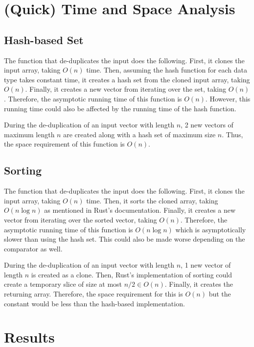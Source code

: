 \section{(Quick) Time and Space Analysis}

\subsection*{Hash-based Set}

The function that de-duplicates the input does the following. First, it clones the input array, taking $O(n)$ time.
Then, assuming the hash function for each data type takes constant time, it creates a hash set from the cloned input array, taking $O(n)$.
Finally, it creates a new vector from iterating over the set, taking $O(n)$. Therefore, the asymptotic running time of this function is $O(n)$. However, this running time could also be affected by the running time of the hash function.

During the de-duplication of an input vector with length $n$, 2 new vectors of maximum length $n$ are created along with a hash set of maximum size $n$. Thus, the space requirement of this function is $O(n)$.

\subsection*{Sorting}

The function that de-duplicates the input does the following. First, it clones the input array, taking $O(n)$ time.
Then, it sorts the cloned array, taking $O(n \log n)$ as mentioned in Rust's documentation.
Finally, it creates a new vector from iterating over the sorted vector, taking $O(n)$. Therefore, the asymptotic running time of this function is $O(n \log n)$ which is asymptotically slower than using the hash set. This could also be made worse depending on the comparator as well.

During the de-duplication of an input vector with length $n$, 1 new vector of length $n$ is created as a clone. Then, Rust's implementation of sorting could create a temporary slice of size at most $n/2 \in O(n)$. Finally, it creates the returning array. Therefore, the space requirement for this is $O(n)$ but the constant would be less than the hash-based implementation.

\section{Results}
